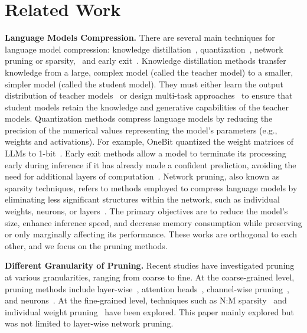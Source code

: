 \section{Related Work}

\textbf{Language Models Compression.} There are several main techniques for language model compression: knowledge distillation~\cite{kd1, kd2, Meta_kd}, quantization~\cite{ZeroQuant, quantization_survey, SmoothQuant}, network pruning or sparsity,~\cite{chess, sparcegpt, slicegpt, wanda, dsnot, sleb, DejaVu} and early exit~\cite{24arxiv-raee, SEENN, deebert}. Knowledge distillation methods transfer knowledge from a large, complex model (called the teacher model) to a smaller, simpler model (called the student model). They must either learn the output distribution of teacher models~\cite{kd3} or design multi-task approaches~\cite{kd4} to ensure that student models retain the knowledge and generative capabilities of the teacher models.  Quantization methods compress language models by reducing the precision of the numerical values representing the model's parameters (e.g., weights and activations). For example, OneBit quantized the weight matrices of LLMs to 1-bit~\cite{1bit}. Early exit methods allow a model to terminate its processing early during inference if it has already made a confident prediction, avoiding the need for additional layers of computation~\cite{ee_llm}. Network pruning, also known as sparsity techniques, refers to methods employed to compress language models by eliminating less significant structures within the network, such as individual weights, neurons, or layers~\cite{sparcegpt, slicegpt, sleb}. The primary objectives are to reduce the model’s size, enhance inference speed, and decrease memory consumption while preserving or only marginally affecting its performance. These works are orthogonal to each other, and we focus on the pruning methods.

\textbf{Different Granularity of Pruning.} Recent studies have investigated pruning at various granularities, ranging from coarse to fine. At the coarse-grained level, pruning methods include layer-wise~\cite{sleb}, attention heads~\cite{att_prun}, channel-wise pruning~\cite{slicegpt,llmpruner}, and neurons~\cite{neur_prun}. At the fine-grained level, techniques such as N:M sparsity~\cite{sparcegpt, wanda, dsnot, nm_sparse1, nm_sparse2} and individual weight pruning~\cite{sparsert} have been explored.
This paper mainly explored but was not limited to layer-wise network pruning.
